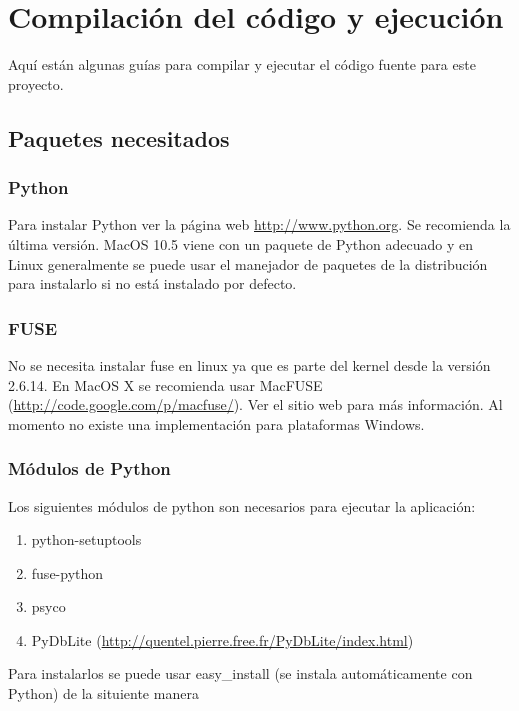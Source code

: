 \chapter{Compilación del código y ejecución}

Aquí están algunas guías para compilar y ejecutar el código fuente para este proyecto.

\section{Paquetes necesitados}

\subsection{Python}

Para instalar Python ver la página web \url{http://www.python.org}. Se recomienda la última versión. MacOS 10.5 viene con un paquete de Python adecuado y en Linux generalmente se puede usar el manejador de paquetes de la distribución para instalarlo si no está instalado por defecto.

\subsection{FUSE}

No se necesita instalar fuse en linux ya que es parte del kernel desde la versión 2.6.14. En MacOS X se recomienda usar MacFUSE (\url{http://code.google.com/p/macfuse/}). Ver el sitio web para más información. Al momento no existe una implementación para plataformas Windows.

\subsection{Módulos de Python}

Los siguientes módulos de python son necesarios para ejecutar la aplicación:

\begin{enumerate}
\item python-setuptools
\item fuse-python
\item psyco
\item PyDbLite (\url{http://quentel.pierre.free.fr/PyDbLite/index.html})
\end{enumerate}

Para instalarlos se puede usar easy\_install (se instala automáticamente con Python) de la situiente manera


